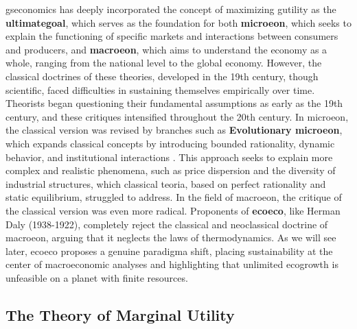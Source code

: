 \documentclass[./main_en.tex]{subfiles}
\begin{document}
\par \gls{gseconomics} has deeply incorporated the concept of maximizing \gls{gutility} as the \textbf{\gls{ultimategoal}}, which serves as the foundation for both \textbf{\gls{microeon}}, which seeks to explain the functioning of specific markets and interactions between consumers and producers, and \textbf{\gls{macroeon}}, which aims to understand the economy as a whole, ranging from the national level to the global economy. However, the classical doctrines of these theories, developed in the 19th century, though scientific, faced difficulties in sustaining themselves empirically over time. Theorists began questioning their fundamental assumptions as early as the 19th century, and these critiques intensified throughout the 20th century. In \gls{microeon}, the classical version was revised by branches such as \textbf{Evolutionary \gls{microeon}}, which expands classical concepts by introducing bounded rationality, dynamic behavior, and institutional interactions \cite{Nelson1985a, Bourgine2006a}. This approach seeks to explain more complex and realistic phenomena, such as price dispersion and the diversity of industrial structures, which classical \gls{teoria}, based on perfect rationality and static equilibrium, struggled to address. In the field of \gls{macroeon}, the critique of the classical version was even more radical. Proponents of \textbf{\gls{ecoeco}}, like Herman Daly (1938-1922), completely reject the classical and neoclassical doctrine of \gls{macroeon}, arguing that it neglects the laws of thermodynamics. As we will see later, \gls{ecoeco} proposes a genuine \gls{paradigma} shift, placing sustainability at the center of macroeconomic analyses and highlighting that unlimited \gls{ecogrowth} is unfeasible on a planet with finite resources.

\subsection{The Theory of Marginal Utility} \label{subsec:marginutil}
\end{document}
